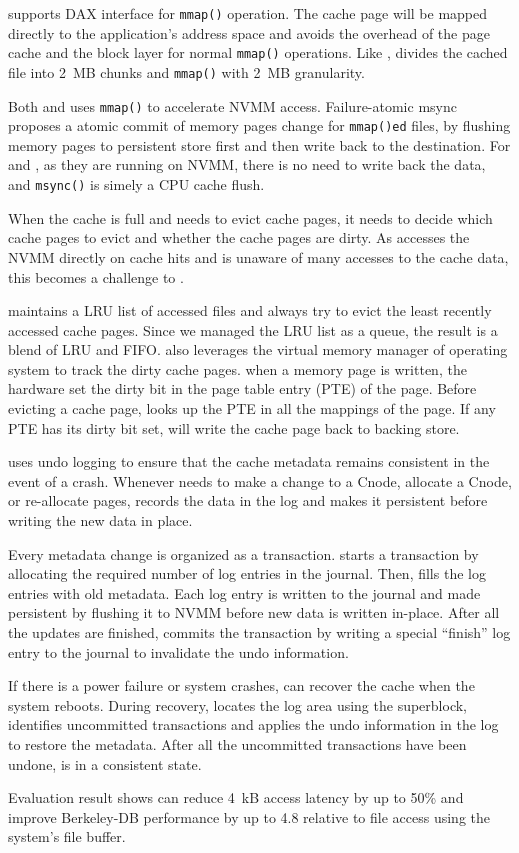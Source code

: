 \CChell supports DAX interface for \texttt{mmap()} operation.
The cache page will be mapped directly to the application's
address space and avoids the overhead of the page cache and the block layer
for normal \texttt{mmap()} operations.
Like \DAChell{}, \CChell{} divides the cached file into 2~MB chunks and
\texttt{mmap()} with 2~MB granularity.

Both \DAChell{} and \CChell uses \texttt{mmap()} to accelerate NVMM access.
Failure-atomic msync~\cite{atomicmsync} proposes a atomic commit of memory
pages change for \texttt{mmap()ed} files, by flushing memory pages to persistent
store first and then write back to the destination. For \DAChell{} and \CChell{}, as they are running on NVMM, there is no need to write back the data, and
\texttt{msync()} is simely a CPU cache flush.

When the cache is full and \drv{}
needs to evict cache pages, it needs to decide which cache pages to evict
and whether the cache pages are dirty. As \lib{} accesses the NVMM directly
on cache hits and \drv{} is unaware of many accesses to the cache data, this
becomes a challenge to \drv{}.

\drv{} maintains a LRU list of accessed files and always try to evict the least
recently accessed cache pages. Since we managed the LRU list as a queue,
the result is a blend of LRU and FIFO.
\CChell{} also leverages the virtual memory manager of operating system to
track the dirty cache pages. 
when a memory page is written, the hardware set the dirty bit in the 
page table entry (PTE) of the page. Before evicting a cache page,
\drv{} looks up the PTE in all the mappings of the page.  If
any PTE has its dirty bit set, \drv{} will write the cache page back to
backing store.

\CChell{} uses undo logging to ensure that the cache metadata remains
consistent in the event of a crash.  Whenever \drv{} needs to make
a change to a Cnode, allocate a Cnode, or re-allocate pages,
\drv{} records the data in the log and makes it persistent before writing
the new data in place.

Every metadata change is organized as a transaction.  \Drv{} starts
a transaction by allocating the required number of log entries in the journal.
Then, \drv{} fills the log entries with old metadata.
Each log entry is written to the journal and made persistent by flushing it
to NVMM before new data is written in-place.
After all the updates are finished, \drv{} commits the transaction
by writing a special ``finish'' log entry to the journal to invalidate the undo information.

If there is a power failure or system crashes, \drv{} can recover the cache
when the system reboots.  During recovery, \drv{} locates the log area using
the superblock,
identifies uncommitted transactions and applies the undo information in the log
to restore the metadata.
After all the uncommitted transactions have been undone, \CChell{} is in a
consistent state.

Evaluation result shows \CChell{} can
reduce 4~kB access latency by up to 50\% and improve Berkeley-DB performance
by up to 4.8\x{} relative to file access using the system's file buffer.
